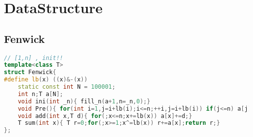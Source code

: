 \section{DataStructure}
\subsection{Fenwick}
\begin{lstlisting}[language=C++]
// [1,n] , init!!
template<class T>
struct Fenwick{
#define lb(x) ((x)&-(x))
    static const int N = 100001;
    int n;T a[N];
    void ini(int _n){ fill_n(a+1,n=_n,0);}
    void Pre(){ for(int i=1,j=i+lb(i);i<=n;++i,j=i+lb(i)) if(j<=n) a[j]+=a[i];}
    void add(int x,T d){ for(;x<=n;x+=lb(x)) a[x]+=d;}
    T sum(int x){ T r=0;for(;x>=1;x^=lb(x)) r+=a[x];return r;}
};
\end{lstlisting}
